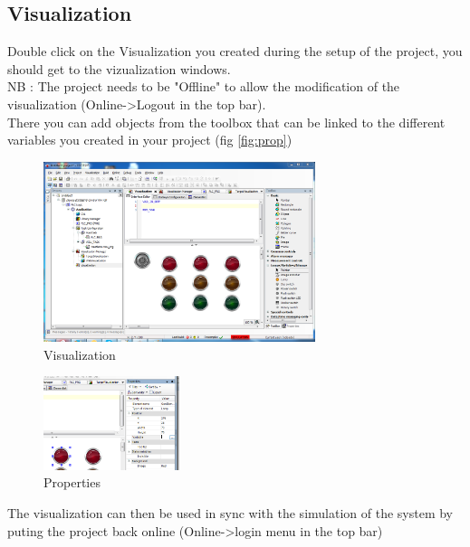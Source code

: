 \documentclass[10pt,a4paper]{article}
\begin{document}
\subsection{Visualization}

Double click on the Visualization you created during the setup of the project, you should get to the vizualization windows.\\
NB : The project needs to be "Offline" to allow the modification of the visualization (Online->Logout in the top bar).\\
There you can add objects from the toolbox that can be linked to the different variables you created in your project (fig \vref{fig:prop})

\begin{figure}[h!]
	\begin{center}
		\includegraphics[width=300px]{img11.PNG}
	\end{center}
\caption{Visualization}
\label{fig:visu}
\end{figure}


\begin{figure}[h!]
	\begin{center}
		\includegraphics[width=150px]{img12.png}
	\end{center}
\caption{Properties}
\label{fig:prop}
\end{figure}

The visualization can then be used in sync with the simulation of the system by puting the project back online (Online->login menu in the top bar)
\end{document}
